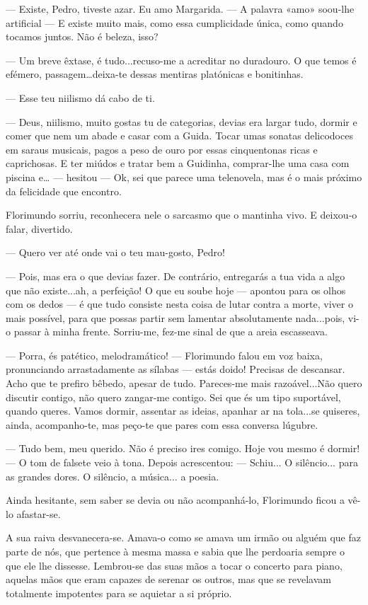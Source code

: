 --- Existe, Pedro, tiveste azar. Eu amo Margarida. ---  A palavra «amo»
soou-lhe artificial --- E existe muito mais, como essa cumplicidade única,
como quando tocamos juntos. Não é beleza, isso?

--- Um breve êxtase, é tudo...recuso-me a acreditar no duradouro. O que
temos é efémero, passagem\ldots{}deixa-te dessas mentiras platónicas e
bonitinhas.

--- Esse teu niilismo dá cabo de ti.

--- Deus, niilismo, muito gostas tu de categorias, devias era largar tudo,
dormir e comer que nem um abade e casar com a Guida. Tocar umas sonatas
delicodoces em saraus musicais, pagos a peso de ouro por essas
cinquentonas ricas e caprichosas. E ter miúdos e tratar bem a Guidinha,
comprar-lhe uma casa com piscina e\ldots{} --- hesitou ---  Ok, sei que
parece uma telenovela, mas é o mais próximo da felicidade que encontro.

Florimundo sorriu, reconhecera nele o sarcasmo que o mantinha vivo. E
deixou-o falar, divertido.

--- Quero ver até onde vai o teu mau-gosto, Pedro!

--- Pois, mas era o que devias fazer. De contrário, entregarás a tua vida
a algo que não existe...ah, a perfeição! O que eu soube hoje --- apontou
para os olhos com os dedos --- é que tudo consiste nesta coisa de lutar
contra a morte, viver o mais possível, para que possas partir sem
lamentar absolutamente nada...pois, vi-o passar à minha frente.
Sorriu-me, fez-me sinal de que a areia escasseava.

--- Porra, és patético, melodramático! --- Florimundo falou em voz baixa,
pronunciando arrastadamente as sílabas --- estás doido! Precisas de
descansar. Acho que te prefiro bêbedo, apesar de tudo. Pareces-me mais
razoável...Não quero discutir contigo, não quero zangar-me contigo. Sei
que és um tipo suportável, quando queres. Vamos dormir, assentar as
ideias, apanhar ar na tola...se quiseres, ainda, acompanho-te, mas
peço-te que pares com essa conversa lúgubre.

--- Tudo bem, meu querido. Não é preciso ires comigo. Hoje vou mesmo é
dormir! --- O tom de falsete veio à tona. Depois acrescentou: --- Schiu... O
silêncio... para as grandes dores. O silêncio, a música... a poesia.

Ainda hesitante, sem saber se devia ou não acompanhá-lo, Florimundo
ficou a vê-lo afastar-se.

A sua raiva desvanecera-se. Amava-o como se amava um irmão ou alguém que
faz parte de nós, que pertence à mesma massa e sabia que lhe perdoaria
sempre o que ele lhe dissesse. Lembrou-se das suas mãos a tocar o
concerto para piano, aquelas mãos que eram capazes de serenar os outros,
mas que se revelavam totalmente impotentes para se aquietar a si
próprio.


